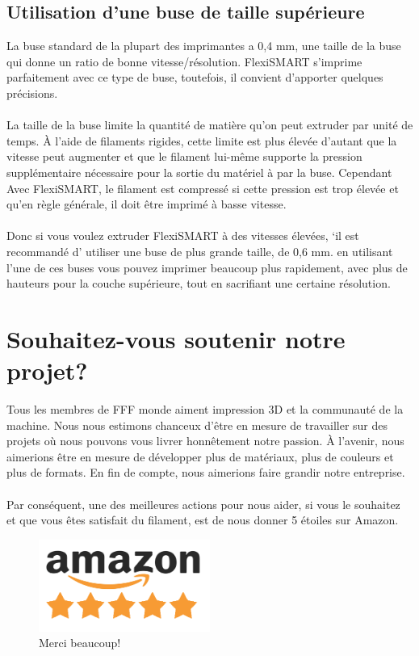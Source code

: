 \documentclass[11pt,a4paper]{article}
\begin{document}
	\subsection{Utilisation d’une buse de taille supérieure}
La buse standard de la plupart des imprimantes a 0,4 mm, une taille de la buse qui donne un ratio de bonne vitesse/résolution. FlexiSMART s’imprime parfaitement avec ce type de buse, toutefois, il convient d’apporter quelques précisions.
\\\\
La taille de la buse limite la quantité de matière qu’on peut extruder par unité de temps. À l’aide de filaments rigides, cette limite est plus élevée d’autant que la vitesse peut augmenter et que le filament lui-même supporte la pression supplémentaire nécessaire pour la sortie du matériel à par la buse. Cependant Avec FlexiSMART, le filament est compressé si cette pression est trop élevée et qu’en règle générale, il doit être imprimé à basse vitesse.
\\\\
Donc si vous voulez extruder FlexiSMART à des vitesses élevées, ‘il est recommandé d’ utiliser une buse de plus grande taille, de 0,6 mm. en utilisant l’une de ces buses vous pouvez imprimer beaucoup plus rapidement, avec plus de hauteurs pour la couche supérieure, tout en sacrifiant une certaine résolution.
\section{Souhaitez-vous soutenir notre projet?}
Tous les membres de FFF monde aiment impression 3D et la communauté de la machine. Nous nous estimons chanceux d’être en mesure de travailler sur des projets où nous pouvons vous livrer honnêtement notre passion. À l’avenir, nous aimerions être en mesure de développer plus de matériaux, plus de couleurs et plus de formats. En fin de compte, nous aimerions faire grandir notre entreprise.
\\\\
Par conséquent, une des meilleures actions pour nous aider, si vous le souhaitez et que vous êtes satisfait du filament, est de nous donner 5 étoiles sur Amazon.
\begin{figure}[H]
\centering
\includegraphics[width=0.5\textwidth,cfbox=azul_marcos 1pt 0pt]{FOTOS/AMAZON_FIVE_STARS}
\caption*{Merci beaucoup!}
\end{figure}
\end{document}
